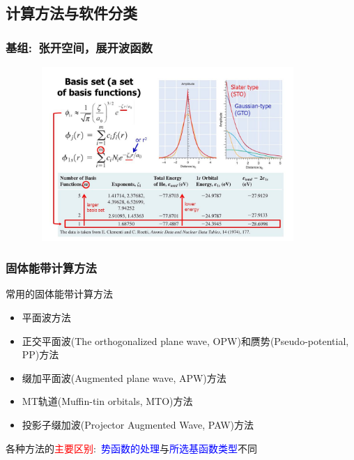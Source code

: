 \subsection{计算方法与软件分类}       %
\frame
{
	\frametitle{基组:~张开空间，展开波函数}
\begin{figure}[h!]
	\vspace{-5pt}
\centering
\includegraphics[height=2.6in,width=4.01in,viewport=0 0 780 550,clip]{Figures/Basis-set-STO-GTO.jpg}
\caption{\fontsize{5.5pt}{4.2pt}}%
\label{Basic-set:STO-GTO}
\end{figure}
}

\frame
{
\frametitle{固体能带计算方法}
\vskip 10pt
常用的固体能带计算方法
\begin{itemize}%
\setlength{\itemsep}{12pt}
	\item	平面波方法
	\item	正交平面波\textrm{(The orthogonalized plane wave, OPW)}和赝势\textrm{(Pseudo-potential, PP)}方法
	\item	缀加平面波\textrm{(Augmented plane wave, APW)}方法
	\item	\textrm{MT}轨道\textrm{(Muffin-tin orbitals, MTO)}方法
	\item	投影子缀加波\textrm{(Projector Augmented Wave, PAW)}方法
\end{itemize}
\vskip 5pt 各种方法的\textcolor{red}{主要区别}:~\textcolor{blue}{势函数的处理}与\textcolor{blue}{所选基函数类型}不同
}

